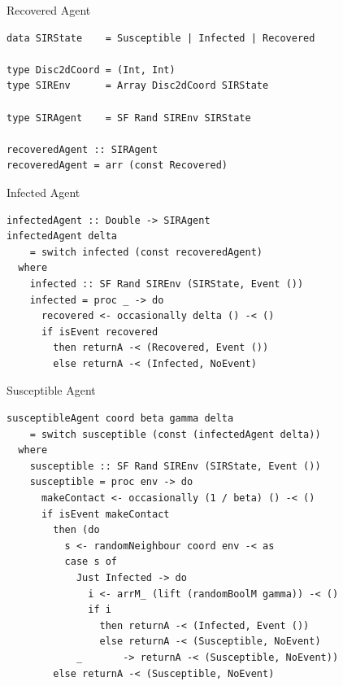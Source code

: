 \documentclass{beamer}
\begin{document}
\begin{frame}[fragile]{Recovered Agent}
\begin{block}{}
\begin{verbatim}
data SIRState    = Susceptible | Infected | Recovered

type Disc2dCoord = (Int, Int)
type SIREnv      = Array Disc2dCoord SIRState

type SIRAgent    = SF Rand SIREnv SIRState

recoveredAgent :: SIRAgent
recoveredAgent = arr (const Recovered) 
\end{verbatim}
\end{block}
\end{frame}

\begin{frame}[fragile]{Infected Agent}
\begin{block}{}
\begin{verbatim}
infectedAgent :: Double -> SIRAgent
infectedAgent delta
    = switch infected (const recoveredAgent)
  where
    infected :: SF Rand SIREnv (SIRState, Event ())
    infected = proc _ -> do
      recovered <- occasionally delta () -< ()
      if isEvent recovered
        then returnA -< (Recovered, Event ())
        else returnA -< (Infected, NoEvent)
\end{verbatim}
\end{block}
\end{frame}

\begin{frame}[fragile]{Susceptible Agent}
\begin{block}{}
\begin{verbatim}
susceptibleAgent coord beta gamma delta 
    = switch susceptible (const (infectedAgent delta))
  where
    susceptible :: SF Rand SIREnv (SIRState, Event ())
    susceptible = proc env -> do
      makeContact <- occasionally (1 / beta) () -< ()
      if isEvent makeContact
        then (do
          s <- randomNeighbour coord env -< as
          case s of
            Just Infected -> do
              i <- arrM_ (lift (randomBoolM gamma)) -< ()
              if i
                then returnA -< (Infected, Event ())
                else returnA -< (Susceptible, NoEvent)
            _       -> returnA -< (Susceptible, NoEvent))
        else returnA -< (Susceptible, NoEvent)
\end{verbatim}
\end{block}
\end{frame}
\end{document}
